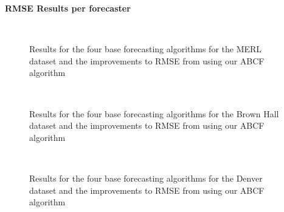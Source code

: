 \newpage

\bigskip 
\noindent \textbf{RMSE Results per forecaster} \\

\begin{figure}[!h]
	\begin{center}
		 \\
	\end{center}
	\caption{Results for the four base forecasting algorithms for the MERL dataset and the improvements to RMSE from using our ABCF algorithm}
	\label{fig:rmse_merl_results}
\end{figure}

\begin{figure}[!h]
	\begin{center}
		 \\
	\end{center}
	\caption{Results for the four base forecasting algorithms for the Brown Hall dataset and the improvements to RMSE from using our ABCF algorithm}
	\label{fig:rmse_brown_results}
\end{figure}

\begin{figure}[!h]
	\begin{center}
		 \\
	\end{center}
	\caption{Results for the four base forecasting algorithms for the Denver dataset and the improvements to RMSE from using our ABCF algorithm}
	\label{fig:rmse_denver_results}
\end{figure}

